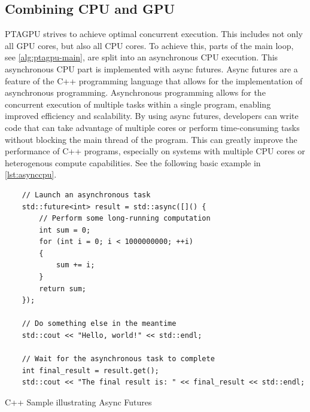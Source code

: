 \subsection{Combining CPU and GPU}\label{sec:cpugpu}
PTAGPU strives to achieve optimal concurrent execution.
This includes not only all GPU cores, but also all CPU cores.
To achieve this, parts of the main loop, see \autoref{alg:ptagpu-main}, are split into an asynchronous CPU execution.
This asynchronous CPU part is implemented with async futures.
Async futures are a feature of the C++ programming language that allows for the implementation of asynchronous programming. Asynchronous programming allows for the concurrent execution of multiple tasks within a single program, enabling improved efficiency and scalability. By using async futures, developers can write code that can take advantage of multiple cores or perform time-consuming tasks without blocking the main thread of the program. This can greatly improve the performance of C++ programs, especially on systems with multiple CPU cores or heterogenous compute capabilities. See the following basic example in \autoref{lst:asynccpu}.

\begin{listing}
    \begin{verbatim}
    // Launch an asynchronous task
    std::future<int> result = std::async([]() {
        // Perform some long-running computation
        int sum = 0;
        for (int i = 0; i < 1000000000; ++i)
        {
            sum += i;
        }
        return sum;
    });

    // Do something else in the meantime
    std::cout << "Hello, world!" << std::endl;

    // Wait for the asynchronous task to complete
    int final_result = result.get();
    std::cout << "The final result is: " << final_result << std::endl;
    \end{verbatim}
    \caption{C++ Sample illustrating Async Futures}
    \label{lst:asynccpu}
\end{listing}


